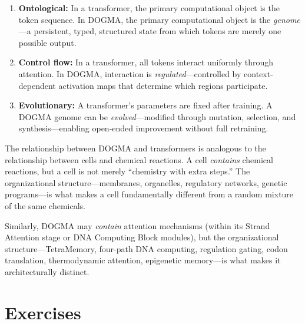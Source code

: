 \begin{enumerate}[leftmargin=1.8em]
  \item \textbf{Ontological:} In a transformer, the primary computational object is the token sequence. In DOGMA, the primary computational object is the \emph{genome}---a persistent, typed, structured state from which tokens are merely one possible output.

  \item \textbf{Control flow:} In a transformer, all tokens interact uniformly through attention. In DOGMA, interaction is \emph{regulated}---controlled by context-dependent activation maps that determine which regions participate.

  \item \textbf{Evolutionary:} A transformer's parameters are fixed after training. A DOGMA genome can be \emph{evolved}---modified through mutation, selection, and synthesis---enabling open-ended improvement without full retraining.
\end{enumerate}

The relationship between DOGMA and transformers is analogous to the relationship between cells and chemical reactions. A cell \emph{contains} chemical reactions, but a cell is not merely ``chemistry with extra steps.'' The organizational structure---membranes, organelles, regulatory networks, genetic programs---is what makes a cell fundamentally different from a random mixture of the same chemicals.

Similarly, DOGMA may \emph{contain} attention mechanisms (within its Strand Attention stage or DNA Computing Block modules), but the organizational structure---TetraMemory, four-path DNA computing, regulation gating, codon translation, thermodynamic attention, epigenetic memory---is what makes it architecturally distinct.

\section{Exercises}
\label{sec:ch7-exercises}

